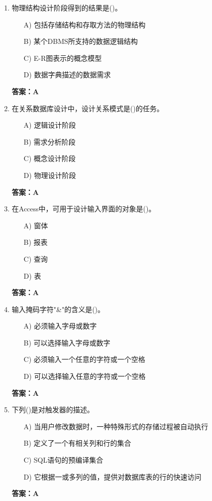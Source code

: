 \documentclass[a4paper,12pt]{article}
\begin{document}
\begin{enumerate}[label=\arabic*.]
\item 物理结构设计阶段得到的结果是()。
\begin{itemize}
    \item[A)] 包括存储结构和存取方法的物理结构
    \item[B)] 某个DBMS所支持的数据逻辑结构
    \item[C)] E-R图表示的概念模型
    \item[D)] 数据字典描述的数据需求
\end{itemize}
\textbf{答案：A}

\item 在关系数据库设计中，设计关系模式是()的任务。
\begin{itemize}
    \item[A)] 逻辑设计阶段
    \item[B)] 需求分析阶段
    \item[C)] 概念设计阶段
    \item[D)] 物理设计阶段
\end{itemize}
\textbf{答案：A}

\item 在Access中，可用于设计输入界面的对象是()。
\begin{itemize}
    \item[A)] 窗体
    \item[B)] 报表
    \item[C)] 查询
    \item[D)] 表
\end{itemize}
\textbf{答案：A}

\item 输入掩码字符"\&"的含义是()。
\begin{itemize}
    \item[A)] 必须输入字母或数字
    \item[B)] 可以选择输入字母或数字
    \item[C)] 必须输入一个任意的字符或一个空格
    \item[D)] 可以选择输入任意的字符或一个空格
\end{itemize}
\textbf{答案：A} 
\item 下列()是对触发器的描述。
\begin{itemize}
    \item[A)] 当用户修改数据时，一种特殊形式的存储过程被自动执行
    \item[B)] 定义了一个有相关列和行的集合
    \item[C)] SQL语句的预编译集合
    \item[D)] 它根据一或多列的值，提供对数据库表的行的快速访问
\end{itemize}
\textbf{答案：A}


\end{enumerate}
\end{document}
